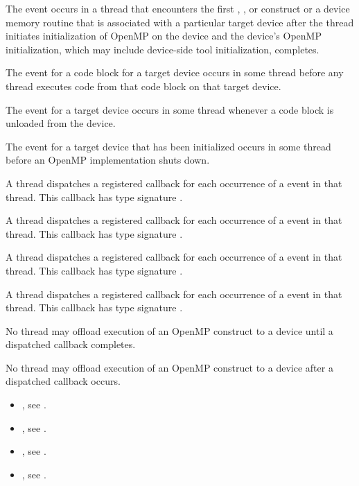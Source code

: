 \events

The  event occurs in a thread that encounters the first 
, , or  construct 
or a device memory routine that 
is associated with a particular target device after the thread initiates 
initialization of OpenMP on the device and the device's OpenMP initialization, 
which may include device-side tool initialization, completes.

The  event for a code block for a target device occurs in some 
thread before any thread executes code from that code block on that target device.

The  event for a target device occurs in some thread
whenever a code block is unloaded from the device.

The  event for a target device that has been initialized
occurs in some thread before an OpenMP implementation shuts down.

\tools

A thread dispatches a registered 
callback for each occurrence of a  event in that 
thread.  This callback has type signature .

A thread dispatches a registered  callback 
for each occurrence of a  event in that thread. This callback 
has type signature .

A thread dispatches a registered 
callback for each occurrence of a  event in
that thread.  This callback has type signature
.

A thread dispatches a registered 
callback for each occurrence of a  event in
that thread.  This callback has type signature
.

\restrictions
No thread may offload execution of an OpenMP construct to a device until a
dispatched  callback completes.

No thread may offload execution of an OpenMP construct to a device after a
dispatched  callback occurs.

\crossreferences
\begin{itemize}
\item {}, see
.

\item {}, see
.

\item {}, see
.

\item {}, see
.
\end{itemize}


